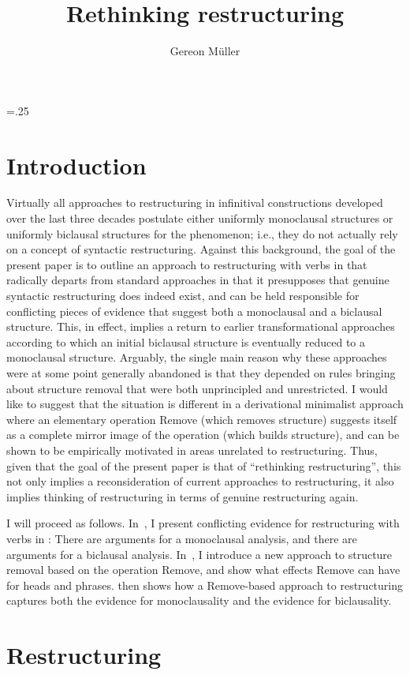 \documentclass[output=paper]{langsci/langscibook}
\author{Gereon Müller\affiliation{Leipzig University}}
\title{Rethinking restructuring}
\begin{document}
\glsresetall
\multicolsep=.25\baselineskip
\section{Introduction}

Virtually all approaches to restructuring in infinitival constructions
developed over the last three decades postulate either uniformly monoclausal
structures or uniformly biclausal structures for the phenomenon; i.e., they do
not actually rely on a concept of syntactic restructuring. Against this
background, the goal of the present paper is to outline an approach to
restructuring with  verbs in  that radically departs from standard
approaches in that it presupposes that genuine syntactic restructuring does
indeed exist, and can be held responsible for conflicting pieces of evidence
that suggest both a monoclausal and a biclausal structure. This, in effect,
implies a return to earlier transformational approaches according to which an
initial biclausal structure is eventually reduced to a monoclausal structure.
Arguably, the single main reason why these approaches were at some point
generally abandoned is that they depended on  rules bringing about
structure removal that were both unprincipled and unrestricted. I would like to
suggest that the situation is different in a derivational minimalist approach
where an elementary operation Remove (which removes structure) suggests itself
as a complete mirror image of the operation  (which builds structure), and
can be shown to be empirically motivated in areas unrelated to restructuring.
Thus, given that the goal of the present paper is that of ``rethinking
restructuring'', this not only implies a reconsideration of current approaches
to restructuring, it also implies thinking of restructuring in terms of genuine
restructuring again.

I will proceed as follows. In~, I present conflicting evidence
for restructuring with  verbs in : There are arguments for a
monoclausal analysis, and there are arguments for a biclausal analysis.
In~, I introduce a new approach to structure removal based on
the operation Remove, and show what effects Remove can have for heads and
phrases.  then shows how a Remove-based approach to
restructuring captures both the evidence for monoclausality and the evidence
for biclausality.

\section{Restructuring}\label{sec:32.2}
\end{document}
